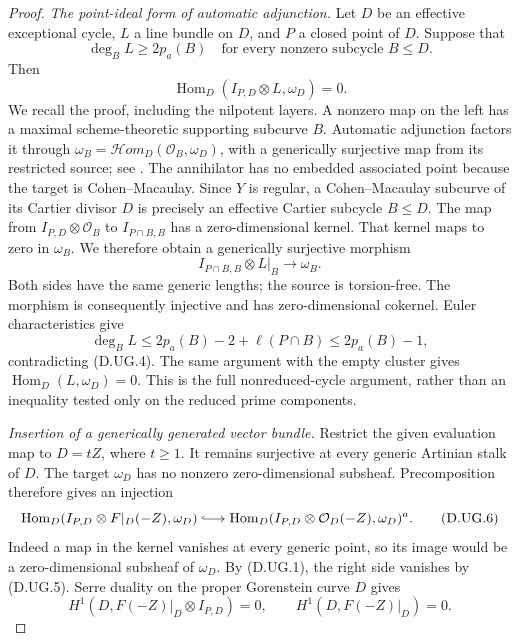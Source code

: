 \begin{proof}
\emph{The point-ideal form of automatic adjunction.}
Let $D$ be an effective exceptional cycle, $L$ a line bundle
on $D$, and $P$ a closed point of $D$. Suppose that
\[
                  \deg_B L\ge2p_a(B)
       \quad\text{for every nonzero subcycle }B\le D.    \tag{D.UG.4}
\]
Then
\[
       \operatorname{Hom}_D(I_{P,D}\otimes L,\omega_D)=0.
                                                               \tag{D.UG.5}
\]
We recall the proof, including the nilpotent layers. A nonzero
map on the left has a maximal scheme-theoretic supporting
subcurve $B$. Automatic adjunction factors it through
$\omega_B=\mathcal Hom_D(\mathcal O_B,\omega_D)$, with a
generically surjective map from its restricted source; see
\citet[Lemma~2.4 and the complete proof of Theorem~1.1,
pp.~192--193]{C_CFHR1999}. The annihilator has no embedded
associated point because the target is Cohen--Macaulay.
Since $Y$ is regular, a Cohen--Macaulay subcurve of its Cartier
divisor $D$ is precisely an effective Cartier subcycle $B\le D$.
The map from $I_{P,D}\otimes\mathcal O_B$ to
$I_{P\cap B,B}$ has a zero-dimensional kernel. That kernel
maps to zero in $\omega_B$. We therefore obtain a generically
surjective morphism
\[
                  I_{P\cap B,B}\otimes L|_B\longrightarrow\omega_B.
\]
Both sides have the same generic lengths; the source is
torsion-free. The morphism is consequently injective and has
zero-dimensional cokernel. Euler characteristics give
\[
 \deg_B L\le 2p_a(B)-2+\ell(P\cap B)\le2p_a(B)-1,
\]
contradicting (D.UG.4). The same argument with the empty cluster
gives $\operatorname{Hom}_D(L,\omega_D)=0$.
This is the full nonreduced-cycle argument, rather than an
inequality tested only on the reduced prime components.

\emph{Insertion of a generically generated vector bundle.}
Restrict the given evaluation map to $D=tZ$, where $t\ge1$.
It remains surjective at every generic Artinian stalk of $D$.
The target $\omega_D$ has no nonzero zero-dimensional subsheaf.
Precomposition therefore gives an injection
\[
 \operatorname{Hom}_D(I_{P,D}\otimes F|_D(-Z),\omega_D)
 \lhook\joinrel\longrightarrow
 \operatorname{Hom}_D(I_{P,D}\otimes\mathcal O_D(-Z),\omega_D)^a.
                                                               \tag{D.UG.6}
\]
Indeed a map in the kernel vanishes at every generic point,
so its image would be a zero-dimensional subsheaf of $\omega_D$.
By (D.UG.1), the right side vanishes by (D.UG.5). Serre duality
on the proper Gorenstein curve $D$ gives
\[
 H^1(D,F(-Z)|_D\otimes I_{P,D})=0,
 \qquad H^1(D,F(-Z)|_D)=0.                              \tag{D.UG.7}
\]


\end{proof}
